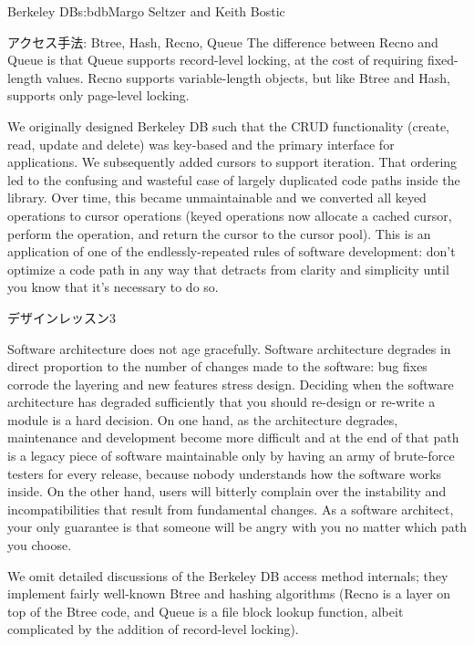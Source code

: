 \begin{aosachapter}{Berkeley DB}{s:bdb}{Margo Seltzer and Keith Bostic}
\begin{aosasect1}{アクセス手法: Btree, Hash, Recno, Queue}
The difference between Recno and Queue is that Queue supports
record-level locking, at the cost of requiring fixed-length values.
Recno supports variable-length objects, but like Btree and Hash,
supports only page-level locking.

We originally designed Berkeley DB such that the CRUD functionality
(create, read, update and delete) was key-based and the primary
interface for applications. We subsequently added cursors to support
iteration. That ordering led to the confusing and wasteful case of
largely duplicated code paths inside the library.  Over time, this
became unmaintainable and we converted all keyed operations to cursor
operations (keyed operations now allocate a cached cursor, perform the
operation, and return the cursor to the cursor pool).  This is an
application of one of the endlessly-repeated rules of software
development: don't optimize a code path in any way that detracts from
clarity and simplicity until you know that it's necessary to do so. 

\begin{aosabox}{デザインレッスン3}

Software architecture does not age gracefully. Software architecture
degrades in direct proportion to the number of changes made to the
software: bug fixes corrode the layering and new features stress
design. Deciding when the software architecture has degraded
sufficiently that you should re-design or re-write a module is a hard
decision. On one hand, as the architecture degrades, maintenance and
development become more difficult and at the end of that path is a
legacy piece of software maintainable only by having an army of
brute-force testers for every release, because nobody understands how
the software works inside. On the other hand, users will bitterly
complain over the instability and incompatibilities that result from
fundamental changes. As a software architect, your only guarantee is
that someone will be angry with you no matter which path you choose.

\end{aosabox}

We omit detailed discussions of the Berkeley DB access method
internals; they implement fairly well-known Btree and hashing
algorithms (Recno is a layer on top of the Btree code, and Queue is a
file block lookup function, albeit complicated by the addition of
record-level locking).

\end{aosasect1}


\end{aosachapter}
